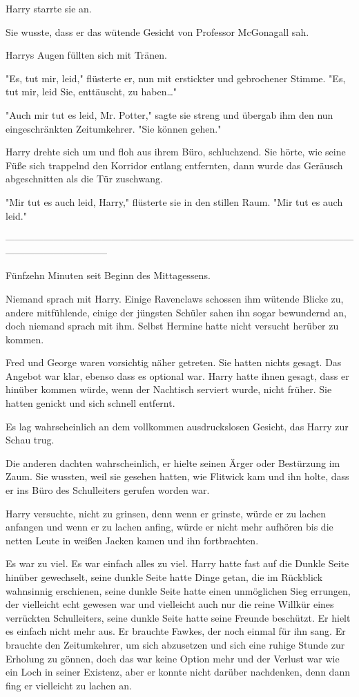 {Harry starrte sie an.

Sie wusste, dass er das wütende Gesicht von Professor McGonagall sah.

Harrys Augen füllten sich mit Tränen.

"Es, tut mir, leid," flüsterte er, nun mit erstickter und gebrochener Stimme. "Es, tut mir, leid Sie, enttäuscht, zu haben…"

"Auch mir tut es leid, Mr. Potter," sagte sie streng und übergab ihm den nun eingeschränkten Zeitumkehrer. "Sie können gehen."

Harry drehte sich um und floh aus ihrem Büro, schluchzend. Sie hörte, wie seine Füße sich trappelnd den Korridor entlang entfernten, dann wurde das Geräusch abgeschnitten als die Tür zuschwang.

"Mir tut es auch leid, Harry," flüsterte sie in den stillen Raum. "Mir tut es auch leid."

--------------------------------------------------------------------------------------------------------------------------------------------

Fünfzehn Minuten seit Beginn des Mittagessens.

Niemand sprach mit Harry. Einige Ravenclaws schossen ihm wütende Blicke zu, andere mitfühlende, einige der jüngsten Schüler sahen ihn sogar bewundernd an, doch niemand sprach mit ihm. Selbst Hermine hatte nicht versucht herüber zu kommen.

Fred und George waren vorsichtig näher getreten. Sie hatten nichts gesagt. Das Angebot war klar, ebenso dass es optional war. Harry hatte ihnen gesagt, dass er hinüber kommen würde, wenn der Nachtisch serviert wurde, nicht früher. Sie hatten genickt und sich schnell entfernt.

Es lag wahrscheinlich an dem vollkommen ausdruckslosen Gesicht, das Harry zur Schau trug.

Die anderen dachten wahrscheinlich, er hielte seinen Ärger oder Bestürzung im Zaum. Sie wussten, weil sie gesehen hatten, wie Flitwick kam und ihn holte, dass er ins Büro des Schulleiters gerufen worden war.

Harry versuchte, nicht zu grinsen, denn wenn er grinste, würde er zu lachen anfangen und wenn er zu lachen anfing, würde er nicht mehr aufhören bis die netten Leute in weißen Jacken kamen und ihn fortbrachten.

Es war zu viel. Es war einfach alles zu viel. Harry hatte fast auf die Dunkle Seite hinüber gewechselt, seine dunkle Seite hatte Dinge getan, die im Rückblick wahnsinnig erschienen, seine dunkle Seite hatte einen unmöglichen Sieg errungen, der vielleicht echt gewesen war und vielleicht auch nur die reine Willkür eines verrückten Schulleiters, seine dunkle Seite hatte seine Freunde beschützt. Er hielt es einfach nicht mehr aus. Er brauchte Fawkes, der noch einmal für ihn sang. Er brauchte den Zeitumkehrer, um sich abzusetzen und sich eine ruhige Stunde zur Erholung zu gönnen, doch das war keine Option mehr und der Verlust war wie ein Loch in seiner Existenz, aber er konnte nicht darüber nachdenken, denn dann fing er vielleicht zu lachen an.

}

